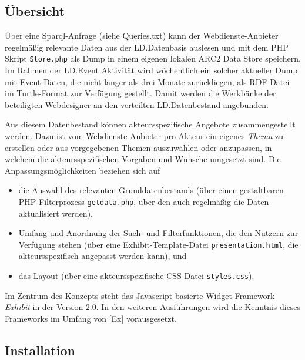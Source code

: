 \documentclass[11pt,a4paper]{article}
\begin{document}
\subsection{Übersicht}

Über eine Sparql-Anfrage (siehe Queries.txt) kann der Webdienste-Anbieter
regelmäßig relevante Daten aus der LD.Datenbasis auslesen und mit dem PHP
Skript \texttt{Store.php} als Dump in einem eigenen lokalen ARC2 Data Store
speichern. Im Rahmen der LD.Event Aktivität wird wöchentlich ein solcher
aktueller Dump mit Event-Daten, die nicht länger als drei Monate zurückliegen,
als RDF-Datei im Turtle-Format zur Verfügung gestellt. Damit werden die
{\glqq}Werkbänke{\grqq} der beteiligten Webdesigner an den verteilten
LD.Datenbestand angebunden.

Aus diesem Datenbestand können akteursspezifische Angebote zusammengestellt
werden.  Dazu ist vom Webdienste-Anbieter pro Akteur ein eigenes \emph{Thema}
zu erstellen oder aus vorgegebenen Themen auszuwählen oder anzupassen, in
welchem die akteursspezifischen Vorgaben und Wünsche umgesetzt sind.  Die
Anpassungsmöglichkeiten beziehen sich auf
\begin{itemize}
\item die Auswahl des relevanten Grunddatenbestands (über einen gestaltbaren
  PHP-Filter\-prozess \texttt{getdata.php}, über den auch regelmäßig die Daten
  aktualisiert werden),
\item Umfang und Anordnung der Such- und Filterfunktionen, die den Nutzern zur
  Verfügung stehen (über eine Exhibit-Template-Datei
  \texttt{presentation.html}, die akteursspezifisch angepasst werden kann),
  und
\item das Layout (über eine akteursspezifische CSS-Datei \texttt{styles.css}). 
\end{itemize}
Im Zentrum des Konzepts steht das Javascript basierte Widget-Framework
\emph{Exhibit} in der Version 2.0. In den weiteren Ausführungen wird die
Kenntnis dieses Frameworks im Umfang von [Ex] vorausgesetzt.

\subsection{Installation}
\end{document}
